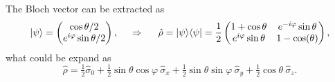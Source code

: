 The Bloch vector can be extracted as
\begin{equation*}
	\ket{\psi} = \begin{pmatrix}
		\cos \theta /2 \\
		e^{i \varphi} \sin \theta/2
	\end{pmatrix},
	\hspace{0.5cm} \Rightarrow \hspace{0.5cm}
	\hat{\rho} = \kb{\psi}{\psi} = \frac{1}{2}\begin{pmatrix}
	    1+\cos \theta & e^{-i \varphi} \sin \theta \\
	    e^{i \varphi} \sin \theta & 1-\cos(\theta) \\
	\end{pmatrix},
\end{equation*}
what could be expand as
\begin{equation*}
	\hat{\rho} = \tfrac{1}{2} \hat{\sigma}_0 + \tfrac{1}{2} \sin \theta \cos \varphi \ \hat{\sigma}_x + \tfrac{1}{2}\sin \theta \sin \varphi\ \hat{\sigma}_y + \tfrac{1}{2}\cos \theta \ \hat{\sigma}_z.
\end{equation*}
